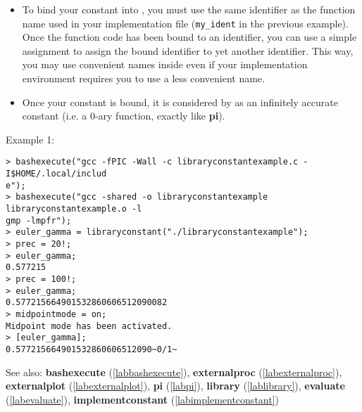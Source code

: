 \begin{itemize}
\item To bind your constant into \sollya, you must use the same identifier as the
   function name used in your implementation file (\verb|my_ident| in the previous
   example). Once the function code has been bound to an identifier, you can use
   a simple assignment to assign the bound identifier to yet another identifier.
   This way, you may use convenient names inside \sollya even if your
   implementation environment requires you to use a less convenient name.

\item Once your constant is bound, it is considered by \sollya as an infinitely
   accurate constant (i.e. a 0-ary function, exactly like \textbf{pi}).
\end{itemize}
\noindent Example 1: 
\begin{center}\begin{minipage}{15cm}\begin{Verbatim}[frame=single]
> bashexecute("gcc -fPIC -Wall -c libraryconstantexample.c -I$HOME/.local/includ
e");
> bashexecute("gcc -shared -o libraryconstantexample libraryconstantexample.o -l
gmp -lmpfr");
> euler_gamma = libraryconstant("./libraryconstantexample");
> prec = 20!;
> euler_gamma;
0.577215
> prec = 100!;
> euler_gamma;
0.577215664901532860606512090082
> midpointmode = on;
Midpoint mode has been activated.
> [euler_gamma];
0.577215664901532860606512090~0/1~
\end{Verbatim}
\end{minipage}\end{center}
See also: \textbf{bashexecute} (\ref{labbashexecute}), \textbf{externalproc} (\ref{labexternalproc}), \textbf{externalplot} (\ref{labexternalplot}), \textbf{pi} (\ref{labpi}), \textbf{library} (\ref{lablibrary}), \textbf{evaluate} (\ref{labevaluate}), \textbf{implementconstant} (\ref{labimplementconstant})
